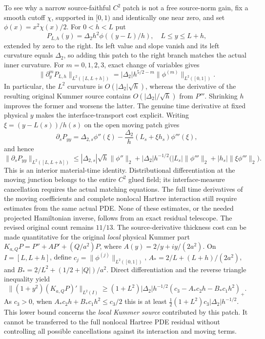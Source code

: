 \documentclass[11pt]{amsart}
\begin{document}
To see why a narrow source-faithful \(C^2\) patch is not a free
source-norm gain, fix a smooth cutoff \(\chi\), supported in
\([0,1)\) and identically one near zero, and set
\(\phi(x)=x^2\chi(x)/2\). For \(0<h<L\) put
\[
P_{L,h}(y)=\Delta_2h^2\phi((y-L)/h),
\quad L\le y\le L+h,
\]
extended by zero to the right. Its left value and slope vanish
and its left curvature equals \(\Delta_2\), so adding this
patch to the right branch matches the actual inner curvature.
For \(m=0,1,2,3\), exact change of variables gives
\[
\|\partial_y^mP_{L,h}\|_{L^2([L,L+h])}
=|\Delta_2|h^{5/2-m}\|\phi^{(m)}\|_{L^2([0,1])}.
\]
In particular, the \(L^2\) curvature is \(O(|\Delta_2|\sqrt h)\),
whereas the derivative of the resulting original Kummer source
contains \(O(|\Delta_2|/\sqrt h)\) from \(P'''\).
Shrinking \(h\) improves the former and worsens the latter.
The genuine time derivative at fixed physical \(y\)
makes the interface-transport cost explicit. Writing
\(\xi=(y-L(s))/h(s)\) on the open moving patch gives
\[
\partial_sP_{yy}=\Delta_{2,s}\phi''(\xi)
 -\frac{\Delta_2}{h}(L_s+\xi h_s)\phi'''(\xi),
\]
and hence
\[
\|\partial_sP_{yy}\|_{L^2([L,L+h])}
\le|\Delta_{2,s}|\sqrt h\|\phi''\|_2
 +|\Delta_2|h^{-1/2}
   \bigl(|L_s|\|\phi'''\|_2+|h_s|\|\xi\phi'''\|_2\bigr).
\]
This is an interior material-time identity. Distributional
differentiation at the moving junction belongs to the entire
\(C^2\) glued field; its interface-measure cancellation requires
the actual matching equations. The full time derivatives of
the moving coefficients and complete nonlocal Hartree
interaction still require estimates from the same actual PDE.
None of these estimates, or the needed projected Hamiltonian
inverse, follows from an exact residual telescope.
The revised original count remains \(11/13\).
The source-derivative thickness cost can be made quantitative for
the original \emph{local} physical Kummer part
\(K_{a,Q}P=P''+A P'+(Q/a^2)P\), where
\(A(y)=2/y+iy/(2a^2)\). On \(I=[L,L+h]\), define
\(c_j=\|\phi^{(j)}\|_{L^2([0,1])}\),
\(A_*=2/L+(L+h)/(2a^2)\), and
\(B_*=2/L^2+(1/2+|Q|)/a^2\).
Direct differentiation and the reverse triangle inequality yield
\[
\|(1+y^2)(K_{a,Q}P)'\|_{L^2(I)}
\ge(1+L^2)|\Delta_2|h^{-1/2}
 (c_3-A_*c_2h-B_*c_1h^2)_+.
\]
As \(c_3>0\), when
\(A_*c_2h+B_*c_1h^2\le c_3/2\)
this is at least
\(\tfrac12(1+L^2)c_3|\Delta_2|h^{-1/2}\).
This lower bound concerns the \emph{local Kummer source}
contributed by this patch. It cannot be transferred to the full
nonlocal Hartree PDE residual without controlling all possible
cancellations against its interaction and moving terms.
\end{document}
